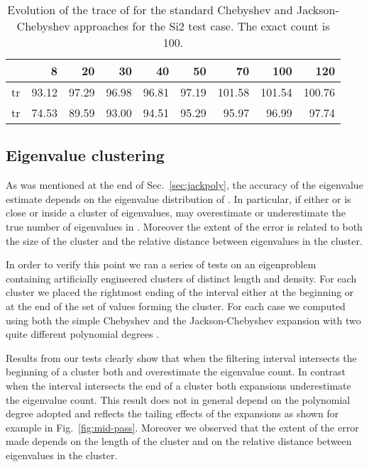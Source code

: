 \documentclass[12pt]{article}		\usepackage{tabls,multirow}
\begin{document}
\begin{table}[htb]
\begin{center}
\begin{tabular}{|l|r|r|r|r|r|r|r|r|} \hline 
    &  8 &  20 &  30 &  40 &  50 &  70 & 100 & 120 \\ \hline
 tr  &
  93.12 &  97.29 &  96.98 &  96.81 &  97.19 & 101.58 & 101.54 & 100.76\\  \hline
tr   & 74.53 & 89.59 & 93.00 &
 94.51 & 95.29 & 95.97 & 96.99 & 97.74 \\ \hline 
\end{tabular}
\end{center} 
\caption{Evolution of the trace of 
  for the  standard Chebyshev  and
  Jackson-Chebyshev 
  approaches for the Si2 test case. The exact count is 100.
  \label{tab:bias}}
\end{table}


\subsection{Eigenvalue clustering}
\label{sec:biasclst}
As was mentioned at the end of Sec.~\ref{sec:jackpoly}, the
accuracy of the eigenvalue estimate depends on the eigenvalue
distribution of . In particular, if either  or  is close or
inside a cluster of eigenvalues,  may overestimate or
underestimate the true number of eigenvalues in . Moreover the
extent of the error is related to both the size of the cluster and the
relative distance  between eigenvalues in the cluster.

In order to verify this point we ran a series of
tests on an eigenproblem containing artificially engineered
clusters of distinct length and density.  For each cluster we placed
the rightmost ending of the interval  either at the beginning
or at the end of the set of values forming the cluster. For each case
we computed  using both the simple Chebyshev
 and the Jackson-Chebyshev expansion  with
two quite different polynomial degrees .

Results from our tests clearly show that when the filtering interval
intersects the beginning of a cluster both  and
 overestimate the eigenvalue count. In contrast when the
interval intersects the end of a cluster both expansions underestimate
the eigenvalue count. This result does not in general depend on the
polynomial degree adopted and reflects the tailing effects of the
expansions as shown for example in Fig.~\ref{fig:mid-pass}. Moreover
we observed that the extent of the error made depends on the length of
the cluster and on the relative distance between eigenvalues in the
cluster.
\end{document}
